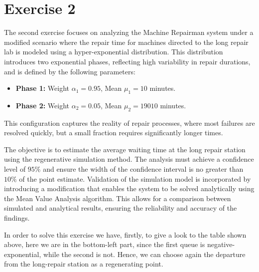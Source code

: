 \documentclass[12pt]{article}
\begin{document}
	\section{Exercise 2}
	The second exercise focuses on analyzing the Machine Repairman system under a modified scenario where the repair time for machines directed to the long repair lab is modeled using a hyper-exponential distribution. This distribution introduces two exponential phases, reflecting high variability in repair durations, and is defined by the following parameters:
	
	\begin{itemize}
		\item \textbf{Phase 1:} Weight $\alpha_1 = 0.95$, Mean $\mu_1 = 10$ minutes.
		\item \textbf{Phase 2:} Weight $\alpha_2 = 0.05$, Mean $\mu_2 = 19010$ minutes.
	\end{itemize}
	
	This configuration captures the reality of repair processes, where most failures are resolved quickly, but a small fraction requires significantly longer times.
	
	The objective is to estimate the average waiting time at the long repair station using the regenerative simulation method. The analysis must achieve a confidence level of $95\%$ and ensure the width of the confidence interval is no greater than $10\%$ of the point estimate. Validation of the simulation model is incorporated by introducing a modification that enables the system to be solved analytically using the Mean Value Analysis algorithm. This allows for a comparison between simulated and analytical results, ensuring the reliability and accuracy of the findings.
	
	In order to solve this exercise we have, firstly, to give a look to the table shown above, here we are in the bottom-left part, since the first queue is negative-exponential, while the second is not. Hence, we can choose again the departure from the long-repair station as a regenerating point.
	
	
\end{document}
